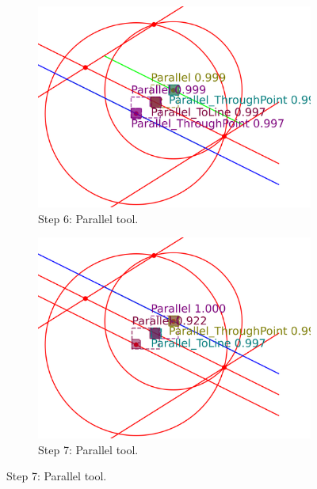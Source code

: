 \begin{figure}[htb!]
\begin{subfigure}[t]{0.32\textwidth}
     \end{subfigure}
     \hfill
     \begin{subfigure}[t]{0.32\textwidth}
         \centering
         \includegraphics[width=\textwidth]{img/Zeta-06_example/output_image5.png}
         \caption{\small Step 6: Parallel tool.}
         \label{fig:Zeta06_example_step6}
     \end{subfigure}
     \hfill
     \begin{subfigure}[t]{0.32\textwidth}
         \centering
         \includegraphics[width=\textwidth]{img/Zeta-06_example/output_image6.png}
         \caption{\small Step 7: Parallel tool.}
         \label{fig:Zeta06_example_step7}
     \end{subfigure}
     \hfill

\end{figure}
